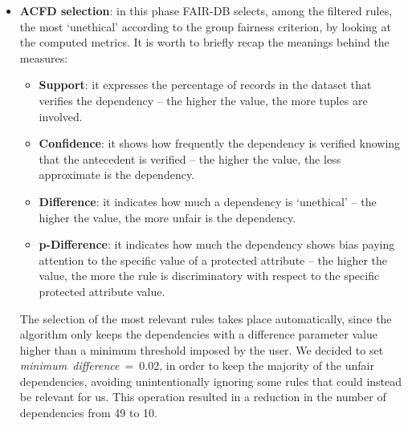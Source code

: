 \begin{itemize}
\item \textbf{ACFD selection}: in this phase FAIR-DB selects, among the filtered rules, the most `unethical' according to the group fairness criterion, by looking at the computed metrics. It is worth to briefly recap the meanings behind the measures:
\begin{itemize}
\item \textbf{Support}: it expresses the percentage of records in the dataset that verifies the dependency -- the higher the value, the more tuples are involved.
\item \textbf{Confidence}: it shows how frequently the dependency is verified knowing that the antecedent is verified -- the higher the value, the less approximate is the dependency.
\item \textbf{Difference}: it indicates how much a dependency is `unethical' -- the higher the value, the more unfair is the dependency.
\item \textbf{p-Difference}: it indicates how much the dependency shows bias paying attention to the specific value of a protected attribute -- the higher the value, the more the rule is discriminatory with respect to the specific protected attribute value.
\end{itemize}

The selection of the most relevant rules takes place automatically, since the algorithm only keeps the dependencies with a difference parameter value higher than a minimum threshold imposed by the user. We decided to set \textit{minimum~difference}~=~0.02, in order to keep the majority of the unfair dependencies, avoiding unintentionally ignoring some rules that could instead be relevant for us. This operation resulted in a reduction in the number of dependencies from 49 to 10.


\end{itemize}
